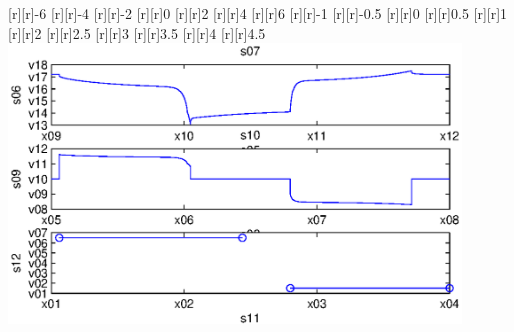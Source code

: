 \begin{psfrags}
[r][r]{-6}%
[r][r]{-4}%
[r][r]{-2}%
[r][r]{0}%
[r][r]{2}%
[r][r]{4}%
[r][r]{6}%
[r][r]{-1}%
[r][r]{-0.5}%
[r][r]{0}%
[r][r]{0.5}%
[r][r]{1}%
[r][r]{2}%
[r][r]{2.5}%
[r][r]{3}%
[r][r]{3.5}%
[r][r]{4}%
[r][r]{4.5}%
%
\includegraphics[width=12cm]{batt_load_exp.eps}%
\end{psfrags}%
%

